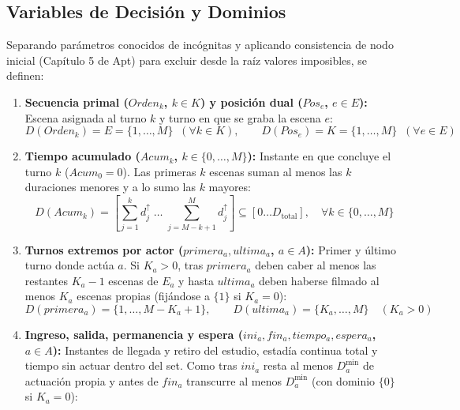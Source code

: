 \subsection{Variables de Decisión y Dominios}

Separando parámetros conocidos de incógnitas y aplicando consistencia de nodo inicial (Capítulo 5 de Apt) para excluir desde la raíz valores imposibles, se definen:
\begin{enumerate}
    \item \textbf{Secuencia primal ($Orden_k$, $k \in K$) y posición dual ($Pos_e$, $e \in E$):} Escena asignada al turno $k$ y turno en que se graba la escena $e$:
    \begin{equation}
        D(Orden_k) = E = \{1, \dots, M\} \;\; (\forall k \in K), \qquad
        D(Pos_e) = K = \{1, \dots, M\} \;\; (\forall e \in E)
        \label{eq:dom_orden_pos}
    \end{equation}
    \item \textbf{Tiempo acumulado ($Acum_k$, $k \in \{0, \dots, M\}$):} Instante en que concluye el turno $k$ ($Acum_0 = 0$). Las primeras $k$ escenas suman al menos las $k$ duraciones menores y a lo sumo las $k$ mayores:
    \begin{equation}
        D(Acum_k) = \left[\sum_{j=1}^{k} d^{\uparrow}_j \;\dots\; \sum_{j=M-k+1}^{M} d^{\uparrow}_j\right] \subseteq [0 \dots D_{\text{total}}], \quad \forall k \in \{0, \dots, M\}
        \label{eq:dom_acum}
    \end{equation}
    \item \textbf{Turnos extremos por actor ($primera_a, ultima_a$, $a \in A$):} Primer y último turno donde actúa $a$. Si $K_a > 0$, tras $primera_a$ deben caber al menos las restantes $K_a - 1$ escenas de $E_a$ y hasta $ultima_a$ deben haberse filmado al menos $K_a$ escenas propias (fijándose a $\{1\}$ si $K_a = 0$):
    \begin{equation}
        D(primera_a) = \{1, \dots, M - K_a + 1\}, \qquad
        D(ultima_a) = \{K_a, \dots, M\} \quad (K_a > 0)
        \label{eq:dom_prim_ult}
    \end{equation}
    \item \textbf{Ingreso, salida, permanencia y espera ($ini_a, fin_a, tiempo_a, espera_a$, $a \in A$):} Instantes de llegada y retiro del estudio, estadía continua total y tiempo sin actuar dentro del set. Como tras $ini_a$ resta al menos $D^{\min}_a$ de actuación propia y antes de $fin_a$ transcurre al menos $D^{\min}_a$ (con dominio $\{0\}$ si $K_a = 0$):
    \begin{align}

\end{align}
\end{enumerate}
